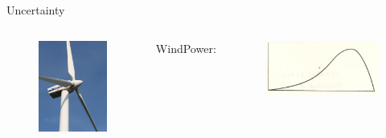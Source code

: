 \begin{frame}{Uncertainty }
\begin{columns}
\begin{figure}[ht]
\includegraphics[width=\textwidth]{images/windmill}
\end{figure}
WindPower:
\begin{figure}[ht]
\includegraphics[width=\textwidth]{images/skew}
\end{figure}


\end{columns}
\end{frame}
